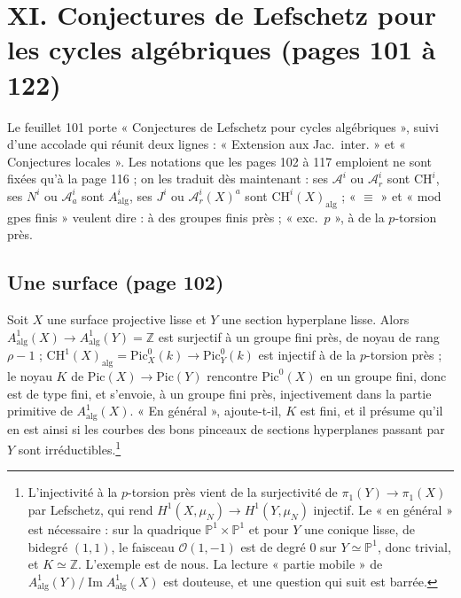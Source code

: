 \documentclass[11pt,a4paper]{article}
\begin{document}
\section*{XI. Conjectures de Lefschetz pour les cycles algébriques (pages 101 à
122)}

Le feuillet 101 porte « Conjectures de Lefschetz pour cycles algébriques »,
suivi d'une accolade qui réunit deux lignes : « Extension aux Jac.\ inter. »
et « Conjectures locales ». Les notations que les pages 102 à 117 emploient ne
sont fixées qu'à la page 116 ; on les traduit dès maintenant : ses
$\mathcal{A}^{i}$ ou $\mathcal{A}^{i}_{r}$ sont $\mathrm{CH}^{i}$, ses $N^{i}$ ou
$\mathcal{A}^{i}_{a}$ sont $A^{i}_{\mathrm{alg}}$, ses $J^{i}$ ou
$\mathcal{A}^{i}_{r}(X)^{a}$ sont $\mathrm{CH}^{i}(X)_{\mathrm{alg}}$ ;
« $\equiv$ » et « mod gpes finis » veulent dire : à des groupes finis près ;
« exc.\ $p$ », à de la $p$-torsion près.

\subsection*{Une surface (page 102)}

Soit $X$ une surface projective lisse et $Y$ une section hyperplane lisse. Alors
$A^{1}_{\mathrm{alg}}(X) \to A^{1}_{\mathrm{alg}}(Y) = \mathbb{Z}$ est surjectif
à un groupe fini près, de noyau de rang $\rho - 1$ ;
$\mathrm{CH}^{1}(X)_{\mathrm{alg}} = \mathrm{Pic}^{0}_{X}(k) \to
\mathrm{Pic}^{0}_{Y}(k)$ est injectif à de la $p$-torsion près ; le noyau $K$ de
$\mathrm{Pic}(X) \to \mathrm{Pic}(Y)$ rencontre $\mathrm{Pic}^{0}(X)$ en un
groupe fini, donc est de type fini, et s'envoie, à un groupe fini près,
injectivement dans la partie primitive de $A^{1}_{\mathrm{alg}}(X)$. « En
général », ajoute-t-il, $K$ est fini, et il présume qu'il en est ainsi si les
courbes des bons pinceaux de sections hyperplanes passant par $Y$ sont
irréductibles.\footnote{L'injectivité à la $p$-torsion près vient de la
surjectivité de $\pi_{1}(Y) \to \pi_{1}(X)$ par Lefschetz, qui rend
$H^{1}(X, \mu_{N}) \to H^{1}(Y, \mu_{N})$ injectif. Le « en général » est
nécessaire : sur la quadrique $\mathbb{P}^{1} \times \mathbb{P}^{1}$ et pour $Y$
une conique lisse, de bidegré $(1,1)$, le faisceau $\mathcal{O}(1,-1)$ est de
degré $0$ sur $Y \simeq \mathbb{P}^{1}$, donc trivial, et $K \simeq \mathbb{Z}$.
L'exemple est de nous. La lecture « partie mobile » de $A^{1}_{\mathrm{alg}}(Y)
/\operatorname{Im}A^{1}_{\mathrm{alg}}(X)$ est douteuse, et une question qui
suit est barrée.}
\end{document}
